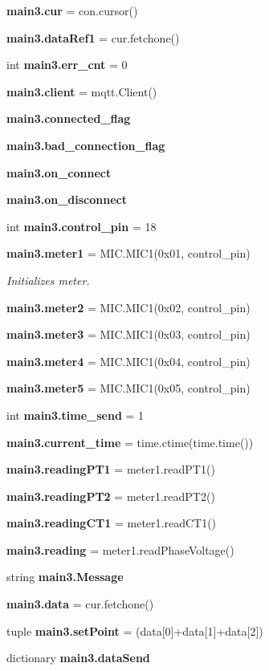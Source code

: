 \begin{DoxyCompactItemize}
\textbf{ main3.\+cur} = con.\+cursor()
\item 
\textbf{ main3.\+data\+Ref1} = cur.\+fetchone()
\item 
int \textbf{ main3.\+err\+\_\+cnt} = 0
\item 
\textbf{ main3.\+client} = mqtt.\+Client()
\item 
\textbf{ main3.\+connected\+\_\+flag}
\item 
\textbf{ main3.\+bad\+\_\+connection\+\_\+flag}
\item 
\textbf{ main3.\+on\+\_\+connect}
\item 
\textbf{ main3.\+on\+\_\+disconnect}
\item 
int \textbf{ main3.\+control\+\_\+pin} = 18
\item 
\textbf{ main3.\+meter1} = M\+I\+C.\+M\+I\+C1(0x01, control\+\_\+pin)
\begin{DoxyCompactList}\small\item\em Initializes meter. \end{DoxyCompactList}\item 
\textbf{ main3.\+meter2} = M\+I\+C.\+M\+I\+C1(0x02, control\+\_\+pin)
\item 
\textbf{ main3.\+meter3} = M\+I\+C.\+M\+I\+C1(0x03, control\+\_\+pin)
\item 
\textbf{ main3.\+meter4} = M\+I\+C.\+M\+I\+C1(0x04, control\+\_\+pin)
\item 
\textbf{ main3.\+meter5} = M\+I\+C.\+M\+I\+C1(0x05, control\+\_\+pin)
\item 
int \textbf{ main3.\+time\+\_\+send} = 1
\item 
\textbf{ main3.\+current\+\_\+time} = time.\+ctime(time.\+time())
\item 
\textbf{ main3.\+reading\+P\+T1} = meter1.\+read\+P\+T1()
\item 
\textbf{ main3.\+reading\+P\+T2} = meter1.\+read\+P\+T2()
\item 
\textbf{ main3.\+reading\+C\+T1} = meter1.\+read\+C\+T1()
\item 
\textbf{ main3.\+reading} = meter1.\+read\+Phase\+Voltage()
\item 
string \textbf{ main3.\+Message}
\item 
\textbf{ main3.\+data} = cur.\+fetchone()
\item 
tuple \textbf{ main3.\+set\+Point} = (data[0]+data[1]+data[2])
\item 
dictionary \textbf{ main3.\+data\+Send}
\end{DoxyCompactItemize}
